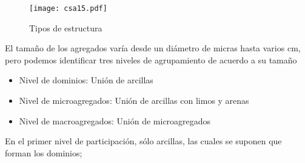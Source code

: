     \begin{figure}[h!]
    \centering
      \texttt{[image: csa15.pdf]}
      \caption{Tipos de estructura}
      \label{csa15}
    \end{figure}
    El tamaño de los agregados varía desde un diámetro de micras hasta varios cm, pero podemos identificar tres niveles de agrupamiento de acuerdo a su tamaño
    \begin{itemize}
        \item Nivel de dominios: Unión de arcillas
        \item Nivel de microagregados: Unión de arcillas con limos y arenas
        \item Nivel de macroagregados: Unión de microagregados
    \end{itemize}
    En el primer nivel de participación, sólo arcillas, las cuales se suponen que forman los dominios;
    

